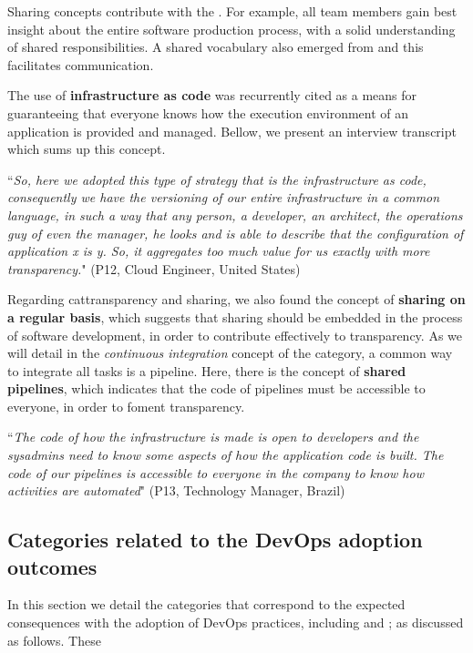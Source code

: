 Sharing concepts contribute with the \cc. For example,
all team members gain best insight about the entire software production
process, with a solid understanding of shared responsibilities. A shared vocabulary also
emerged from  and this facilitates communication.

The use of \textbf{infrastructure as code} was
recurrently cited as a means for guaranteeing that everyone knows how the execution environment of
an application is provided and managed. Bellow, we present an interview
transcript which sums up this concept.

\begin{mq}
``\emph{So, here we adopted this type of strategy that is the infrastructure as code,
consequently we have the versioning of our entire infrastructure in a common
language, in such a way that any person, a developer, an architect, the
operations guy of even the manager, he looks and is able to describe that the
configuration of application x is y. So, it aggregates too much value for us
exactly with more transparency.}" (P12, Cloud Engineer, United States)
\end{mq}

Regarding cat{transparency and sharing}, we also found the concept of \textbf{sharing on a regular basis}, which suggests
that sharing should be embedded in the process of software
development, in order to contribute effectively to transparency.
As we will detail in the \emph{continuous integration} concept of
the  category, a common way to integrate all tasks is a pipeline. Here, there is the
concept of \textbf{shared pipelines}, which indicates that the code of pipelines
must be accessible to everyone, in order to foment transparency.

\begin{mq}
``\emph{The code of how the infrastructure is
made is open to developers and the sysadmins need to know some aspects of how
the application code is built. The code of our pipelines is accessible to
everyone in the company to know how activities are automated}" (P13, Technology
Manager, Brazil)
\end{mq}


\subsection{Categories related to the DevOps adoption outcomes}

In this section we detail the categories that correspond to
the expected consequences with the adoption of
DevOps practices, including  and ;
as discussed as follows.
These

